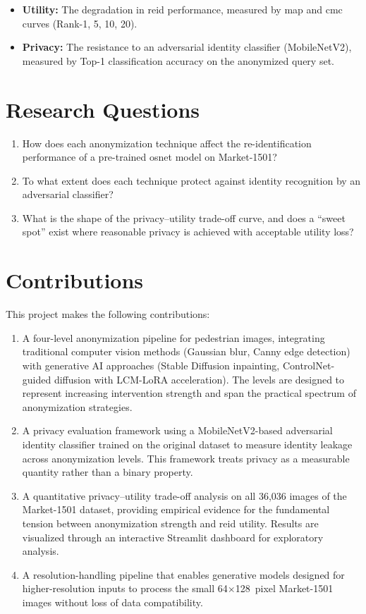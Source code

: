 \begin{itemize}[noitemsep]
    \item \textbf{Utility:} The degradation in \acrshort{reid} performance, measured by \acrlong{map} and \acrlong{cmc} curves (Rank-1, 5, 10, 20).
    \item \textbf{Privacy:} The resistance to an adversarial identity classifier (MobileNetV2), measured by Top-1 classification accuracy on the anonymized query set.
\end{itemize}

\section{Research Questions}

\begin{enumerate}[noitemsep]
    \item How does each anonymization technique affect the re-identification performance of a pre-trained \acrshort{osnet} model on Market-1501?
    \item To what extent does each technique protect against identity recognition by an adversarial classifier?
    \item What is the shape of the privacy--utility trade-off curve, and does a ``sweet spot'' exist where reasonable privacy is achieved with acceptable utility loss?
\end{enumerate}

\section{Contributions}

This project makes the following contributions:

\begin{enumerate}[noitemsep]
    \item A four-level anonymization pipeline for pedestrian images, integrating traditional computer vision methods (Gaussian blur, Canny edge detection) with generative AI approaches (Stable Diffusion inpainting, ControlNet-guided diffusion with LCM-LoRA acceleration). The levels are designed to represent increasing intervention strength and span the practical spectrum of anonymization strategies.
    \item A privacy evaluation framework using a MobileNetV2-based adversarial identity classifier trained on the original dataset to measure identity leakage across anonymization levels. This framework treats privacy as a measurable quantity rather than a binary property.
    \item A quantitative privacy--utility trade-off analysis on all 36,036 images of the Market-1501 dataset, providing empirical evidence for the fundamental tension between anonymization strength and \acrshort{reid} utility. Results are visualized through an interactive Streamlit dashboard for exploratory analysis.
    \item A resolution-handling pipeline that enables generative models designed for higher-resolution inputs to process the small 64$\times$128~pixel Market-1501 images without loss of data compatibility.
\end{enumerate}
